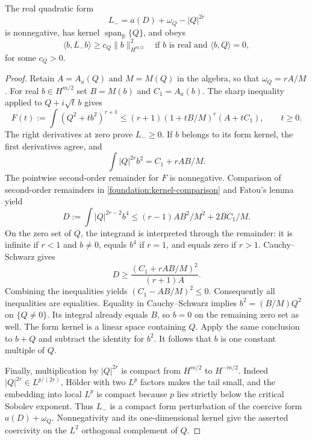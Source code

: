 \begin{lemma}\label{foundation:phase}
The real quadratic form
\[
 L_-=a(D)+\omega_Q-|Q|^{2r}
\]
is nonnegative, has kernel $\operatorname{span}_{\mathbb R}\{Q\}$,
and obeys
\[
 \langle b,L_-b\rangle\ge c_Q\|b\|_{H^{m/2}}^2
 \quad\text{if }b\text{ is real and }\langle b,Q\rangle=0,
\]
for some $c_Q>0$.
\end{lemma}
\begin{proof}
Retain $A=A_a(Q)$ and $M=M(Q)$ in the algebra, so that
$\omega_Q=rA/M$. For real $b\in H^{m/2}$ set
$B=M(b)$ and $C_1=A_a(b)$.
The sharp inequality applied to $Q+i\sqrt t\,b$ gives
\begin{equation}\label{foundation:kernel-comparison}
 F(t):=\int(Q^2+tb^2)^{r+1}
 \le(r+1)(1+tB/M)^r(A+tC_1),\qquad t\ge0.
\end{equation}
The right derivatives at zero prove $L_-\ge0$.
If $b$ belongs to its form kernel, the first derivatives agree, and
\[
 \int |Q|^{2r}b^2=C_1+rAB/M.
\]
The pointwise second-order remainder for $F$ is nonnegative.
Comparison of second-order remainders in
\eqref{foundation:kernel-comparison} and Fatou's lemma yield
\[
 D:=\int |Q|^{2r-2}b^4
 \le(r-1)AB^2/M^2+2BC_1/M.
\]
On the zero set of $Q$, the integrand is interpreted through
the remainder: it is infinite if $r<1$ and $b\ne0$, equals $b^4$
if $r=1$, and equals zero if $r>1$.
Cauchy--Schwarz gives
\[
 D\ge\frac{(C_1+rAB/M)^2}{(r+1)A}.
\]
Combining the inequalities yields
$(C_1-AB/M)^2\le0$. Consequently all inequalities are equalities.
Equality in Cauchy--Schwarz implies
$b^2=(B/M)Q^2$ on $\{Q\ne0\}$. Its integral already equals $B$,
so $b=0$ on the remaining zero set as well.
The form kernel is a linear space containing $Q$. Apply the same
conclusion to $b+Q$ and subtract the identity for $b^2$.
It follows that $b$ is one constant multiple of $Q$.

Finally, multiplication by $|Q|^{2r}$ is compact from $H^{m/2}$
to $H^{-m/2}$. Indeed $|Q|^{2r}\in L^{p/(2r)}$,
H\"older with two $L^p$ factors makes the tail small, and the
embedding into local $L^p$ is compact because $p$ lies strictly
below the critical Sobolev exponent. Thus $L_-$ is a compact
form perturbation of the coercive form $a(D)+\omega_Q$.
Nonnegativity and its one-dimensional kernel give the asserted
coercivity on the $L^2$ orthogonal complement of $Q$.
\end{proof}

